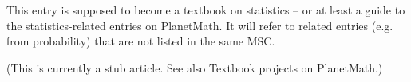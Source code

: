 \documentclass[12pt]{article}
\begin{document}
This entry is supposed to become a textbook on statistics -- or 
at least a guide to the statistics-related entries on PlanetMath.
It will refer to related entries (e.g. from probability) that
are not listed in the same MSC.

(This is currently a stub article. See also Textbook projects on PlanetMath.)
\end{document}
